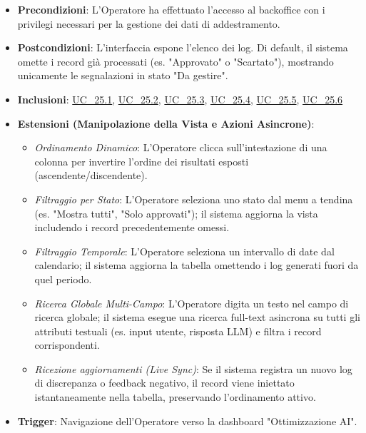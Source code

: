 \begin{itemize}
\begin{enumerate}
        \item Per ogni record, esposizione Timestamp $\rightarrow$ Include: \hyperref[uc_25.6]{UC\_25.6}
    \end{enumerate}
    \item \textbf{Precondizioni}: L'Operatore ha effettuato l'accesso al backoffice con i privilegi necessari per la gestione dei dati di addestramento.
    \item \textbf{Postcondizioni}: L'interfaccia espone l'elenco dei log. Di default, il sistema omette i record già processati (es. "Approvato" o "Scartato"), mostrando unicamente le segnalazioni in stato "Da gestire".
    \item \textbf{Inclusioni}: \hyperref[uc_25.1]{UC\_25.1}, \hyperref[uc_25.2]{UC\_25.2}, \hyperref[uc_25.3]{UC\_25.3}, \hyperref[uc_25.4]{UC\_25.4}, \hyperref[uc_25.5]{UC\_25.5}, \hyperref[uc_25.6]{UC\_25.6}
    \item \textbf{Estensioni (Manipolazione della Vista e Azioni Asincrone)}:
    \begin{itemize}
        \item \textit{Ordinamento Dinamico}: L'Operatore clicca sull'intestazione di una colonna per invertire l'ordine dei risultati esposti (ascendente/discendente).
        \item \textit{Filtraggio per Stato}: L'Operatore seleziona uno stato dal menu a tendina (es. "Mostra tutti", "Solo approvati"); il sistema aggiorna la vista includendo i record precedentemente omessi.
        \item \textit{Filtraggio Temporale}: L'Operatore seleziona un intervallo di date dal calendario; il sistema aggiorna la tabella omettendo i log generati fuori da quel periodo.
        \item \textit{Ricerca Globale Multi-Campo}: L'Operatore digita un testo nel campo di ricerca globale; il sistema esegue una ricerca full-text asincrona su tutti gli attributi testuali (es. input utente, risposta LLM) e filtra i record corrispondenti.
        \item \textit{Ricezione aggiornamenti (Live Sync)}: Se il sistema registra un nuovo log di discrepanza o feedback negativo, il record viene iniettato istantaneamente nella tabella, preservando l'ordinamento attivo.
    \end{itemize}
    \item \textbf{Trigger}: Navigazione dell'Operatore verso la dashboard "Ottimizzazione AI".
\end{itemize}

